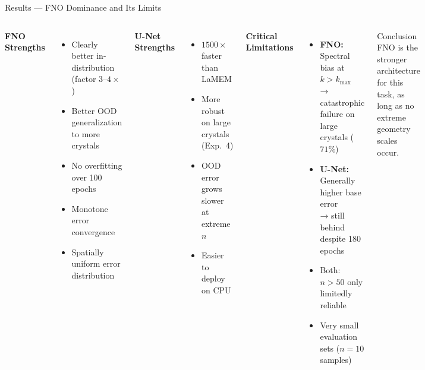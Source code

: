 \documentclass[aspectratio=169, 10pt]{beamer}
\begin{document}
\begin{frame}{Results — FNO Dominance and Its Limits}
  \begin{columns}[T]
      \textbf{\textcolor{fnocolor}{FNO Strengths}}
      \begin{itemize}
        \item Clearly better in-distribution (factor $3$–$4\times$)
        \item Better OOD generalization to more crystals
        \item No overfitting over 100 epochs
        \item Monotone error convergence
        \item Spatially uniform error distribution
      \end{itemize}

      \vspace{0.5em}
      \textbf{\textcolor{unetcolor}{U-Net Strengths}}
      \begin{itemize}
        \item $1500\times$ faster than LaMEM
        \item More robust on large crystals (Exp.~4)
        \item OOD error grows slower at extreme $n$
        \item Easier to deploy on CPU
      \end{itemize}

      \textbf{Critical Limitations}
      \begin{itemize}
        \item \textbf{FNO:} Spectral bias at $k > k_\text{max}$\\
          → catastrophic failure on large crystals ($71\%$)
        \item \textbf{U-Net:} Generally higher base error\\
          → still behind despite 180 epochs
        \item Both: $n>50$ only limitedly reliable
        \item Very small evaluation sets ($n=10$ samples)
      \end{itemize}

      \vspace{0.5em}
      \begin{block}{Conclusion}
        FNO is the stronger architecture for this task,
        as long as no extreme geometry scales occur.
      \end{block}
  \end{columns}
\end{frame}
\end{document}
